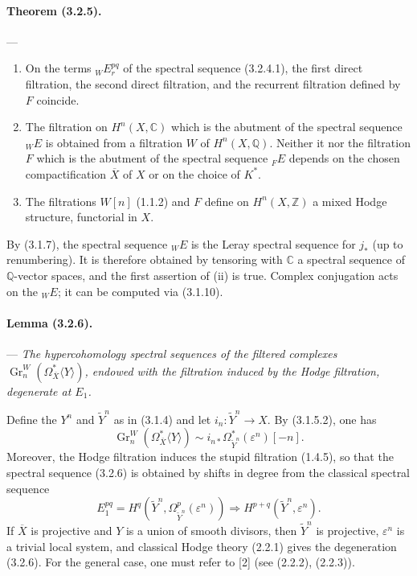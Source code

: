 \documentclass[10pt]{article}
\newcommand{\C}{\mathbb C}
\newcommand{\Q}{\mathbb Q}
\newcommand{\Z}{\mathbb Z}
\newcommand{\Gr}{\operatorname{Gr}}
\begin{document}
\paragraph{Theorem (3.2.5).} --- {\itshape
\begin{enumerate}[label=(\roman*),font=\itshape]
\item On the terms ${}_WE_r^{pq}$ of the spectral sequence (3.2.4.1), the first direct filtration, the second direct filtration, and the recurrent filtration defined by $F$ coincide.
\item The filtration on $H^n(X,\C)$ which is the abutment of the spectral sequence ${}_WE$ is obtained from a filtration $W$ of $H^n(X,\Q)$. Neither it nor the filtration $F$ which is the abutment of the spectral sequence ${}_FE$ depends on the chosen compactification $\overline X$ of $X$ or on the choice of $K^*$.
\item The filtrations $W[n]$ (1.1.2) and $F$ define on $H^n(X,\Z)$ a mixed Hodge structure, functorial in $X$.
\end{enumerate}}

By (3.1.7), the spectral sequence ${}_WE$ is the Leray spectral sequence for $j_*$ (up to renumbering). It is therefore obtained by tensoring with $\C$ a spectral sequence of $\Q$-vector spaces, and the first assertion of (ii) is true. Complex conjugation acts on the ${}_WE$; it can be computed via (3.1.10).

\paragraph{Lemma (3.2.6).} --- {\itshape The hypercohomology spectral sequences of the filtered complexes $\Gr_n^W(\Omega_{\overline X}^{*}\langle Y\rangle)$, endowed with the filtration induced by the Hodge filtration, degenerate at $E_1$.}

Define the $Y^n$ and $\widetilde Y^n$ as in (3.1.4) and let $i_n:\widetilde Y^n\to X$. By (3.1.5.2), one has
\[
\Gr_n^W(\Omega_{\overline X}^{*}\langle Y\rangle)
\sim i_{n*}\Omega_{\widetilde Y^n}^{*}(\varepsilon^n)[-n].
\]
Moreover, the Hodge filtration induces the stupid filtration (1.4.5), so that the spectral sequence (3.2.6) is obtained by shifts in degree from the classical spectral sequence
\[
E_1^{pq}=H^q(\widetilde Y^n,\Omega_{\widetilde Y^n}^p(\varepsilon^n))
\Rightarrow H^{p+q}(\widetilde Y^n,\varepsilon^n).
\]
If $\overline X$ is projective and $Y$ is a union of smooth divisors, then $\widetilde Y^n$ is projective, $\varepsilon^n$ is a trivial local system, and classical Hodge theory (2.2.1) gives the degeneration (3.2.6). For the general case, one must refer to [2] (see (2.2.2), (2.2.3)).
\end{document}
